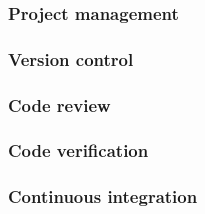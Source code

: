 \begin{frame}
\frametitle{Project management}

\end{frame}

\begin{frame}
\frametitle{Version control}

\end{frame}

\begin{frame}
\frametitle{Code review}

\end{frame}

\begin{frame}
\frametitle{Code verification}

\end{frame}

\begin{frame}
\frametitle{Continuous integration}

\end{frame}
